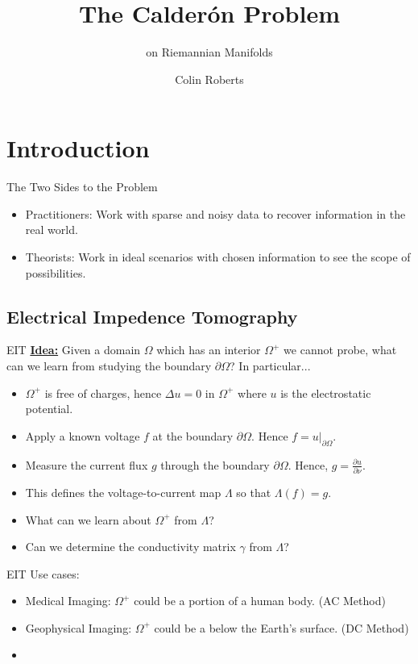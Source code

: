 \documentclass[aspectratio=169]{beamer}
\author{Colin Roberts}
\title{The Calder\'on Problem}
\subtitle{on Riemannian Manifolds}
\begin{document}
\section{Introduction}

\begin{frame}{The Two Sides to the Problem}
    \begin{itemize}
        \item Practitioners: Work with sparse and noisy data to recover information in the real world.
        \item Theorists: Work in ideal scenarios with chosen information to see the scope of possibilities.
    \end{itemize}
\end{frame}

\subsection{Electrical Impedence Tomography}

\begin{frame}{EIT}
    \textbf{\underline{Idea:}} Given a domain $\Omega$ which has an interior $\Omega^+$ we cannot probe, what can we learn from studying the boundary $\partial \Omega$? In particular...
    \begin{itemize}
        \item $\Omega^+$ is free of charges, hence $\Delta u = 0$ in $\Omega^+$ where $u$ is the electrostatic potential.
        \item Apply a known voltage $f$ at the boundary $\partial \Omega$. Hence $f = u \vert_{\partial \Omega}$.
        \item Measure the current flux $g$ through the boundary $\partial \Omega$. Hence, $g = \frac{\partial u}{\partial \nu}$.
        \item This defines the voltage-to-current map $\Lambda$ so that $\Lambda(f) = g$.
        \item What can we learn about $\Omega^+$ from $\Lambda$?
        \item Can we determine the conductivity matrix $\gamma$ from $\Lambda$?
    \end{itemize}
\end{frame}

\begin{frame}{EIT}
    Use cases:
    \begin{itemize}
        \item Medical Imaging: $\Omega^+$ could be a portion of a human body. (AC Method)
        \item Geophysical Imaging: $\Omega^+$ could be a below the Earth's surface. (DC Method)
        \item 
    \end{itemize}
\end{frame}
\end{document}
